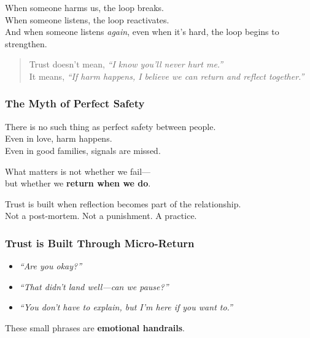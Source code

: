 When someone harms us, the loop breaks.\\
When someone listens, the loop reactivates.\\
And when someone listens \emph{again}, even when it's hard, the loop
begins to strengthen.

\begin{quote}
Trust doesn't mean, \emph{``I know you'll never hurt me.''\\
} It means, \emph{``If harm happens, I believe we can return and reflect
together.''}
\end{quote}

\subsubsection{\texorpdfstring{\textbf{The Myth of Perfect
Safety}}{The Myth of Perfect Safety}}\label{the-myth-of-perfect-safety}

There is no such thing as perfect safety between people.\\
Even in love, harm happens.\\
Even in good families, signals are missed.

What matters is not whether we fail---\\
but whether we \textbf{return when we do}.

Trust is built when reflection becomes part of the relationship.\\
Not a post-mortem. Not a punishment. A practice.

\subsubsection{\texorpdfstring{\textbf{Trust is Built Through
Micro-Return}}{Trust is Built Through Micro-Return}}\label{trust-is-built-through-micro-return}

\begin{itemize}
\item
  \emph{``Are you okay?''\\
  }
\item
  \emph{``That didn't land well---can we pause?''\\
  }
\item
  \emph{``You don't have to explain, but I'm here if you want to.''\\
  }
\end{itemize}

These small phrases are \textbf{emotional handrails}.

